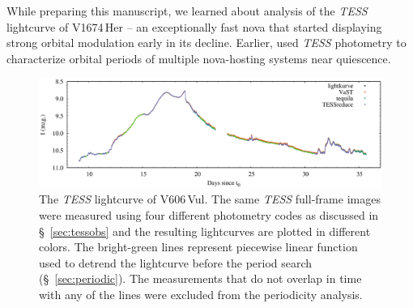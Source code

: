 \documentclass[twocolumn]{aastex631}
\newcommand{\nova}{V606\,Vul}
\begin{document}
While preparing this manuscript, we learned about \cite{2023arXiv231002220L}
analysis of the {\em TESS} lightcurve of V1674\,Her -- an exceptionally fast
nova that started displaying strong orbital modulation early in its decline.
Earlier, \cite{2022MNRAS.517.3640S,2023MNRAS.525..785S,2023MNRAS.519..352B,2023MNRAS.525.1953B} used {\em TESS} photometry to
characterize orbital periods of multiple nova-hosting systems near quiescence.


\begin{figure}
        \includegraphics[width=1.0\linewidth,clip=true,trim=0.0cm 0cm 0cm 0cm,angle=0]{TESS.eps}
\caption{The {\em TESS} lightcurve of \nova{}. The same {\em TESS} full-frame images were measured using four different photometry codes
as discussed in \S~\ref{sec:tessobs} and the resulting lightcurves are
plotted in different colors. The bright-green lines represent piecewise linear function
used to detrend the lightcurve before the period search (\S~\ref{sec:periodic}).
The measurements that do not overlap in time with any of the lines were
excluded from the periodicity analysis.}
    \label{fig:tess}
\end{figure}
\end{document}
